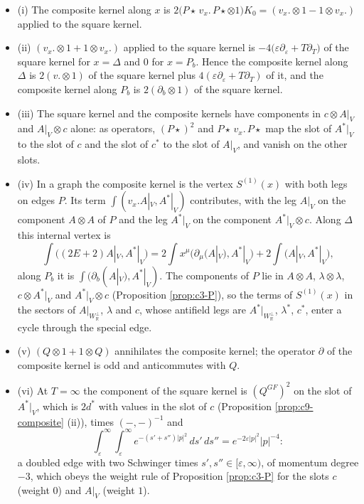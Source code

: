 \begin{lemma}
\label{lem:c11-kernels}
\begin{itemize}
\item (i) The composite kernel along $x$ is $2\big(P\star\,v_x.\,P\star\otimes1\big)K_0=(v_x.\otimes1-1\otimes v_x.)$ applied to the square kernel.
\item (ii) $(v_x.\otimes1+1\otimes v_x.)$ applied to the square kernel is $-4\big(\varepsilon\partial_\varepsilon+T\partial_T\big)$ of the square kernel for $x=\Delta$ and $0$ for $x=P_b$. Hence the composite kernel along $\Delta$ is $2(v.\otimes1)$ of the square kernel plus $4(\varepsilon\partial_\varepsilon+T\partial_T)$ of it, and the composite kernel along $P_b$ is $2(\partial_b\otimes1)$ of the square kernel.
\item (iii) The square kernel and the composite kernels have components in $c\otimes A|_V$ and $A|_V\otimes c$ alone: as operators, $(P\star)^2$ and $P\star\,v_x.\,P\star$ map the slot of $A^*|_V$ to the slot of $c$ and the slot of $c^*$ to the slot of $A|_V$, and vanish on the other slots.
\item (iv) In a graph the composite kernel is the vertex $S^{(1)}(x)$ with both legs on edges $P$. Its term $\int(v_x.A|_V,A^*|_V)$ contributes, with the leg $A|_V$ on the component $A\otimes A$ of $P$ and the leg $A^*|_V$ on the component $A^*|_V\otimes c$. Along $\Delta$ this internal vertex is
\[
\int\big((2E+2)A|_V,A^*|_V\big)=2\int x^\mu\big(\partial_\mu(A|_V),A^*|_V\big)+2\int\big(A|_V,A^*|_V\big),
\]
along $P_b$ it is $\int(\partial_b(A|_V),A^*|_V)$. The components of $P$ lie in $A\otimes A$, $\lambda\otimes\lambda$, $c\otimes A^*|_V$ and $A^*|_V\otimes c$ (Proposition \ref{prop:c3-P}), so the terms of $S^{(1)}(x)$ in the sectors of $A|_{W_{\mathbb R}^\perp}$, $\lambda$ and $c$, whose antifield legs are $A^*|_{W_{\mathbb R}^\perp}$, $\lambda^*$, $c^*$, enter a cycle through the special edge.
\item (v) $(Q\otimes1+1\otimes Q)$ annihilates the composite kernel; the operator $\partial$ of the composite kernel is odd and anticommutes with $Q$.
\item (vi) At $T=\infty$ the component of the square kernel is $(Q^{GF})^2$ on the slot of $A^*|_V$, which is $2d^*$ with values in the slot of $c$ (Proposition \ref{prop:c9-composite} (ii)), times $(-,-)^{-1}$ and
\[
\int_\varepsilon^\infty\!\!\int_\varepsilon^\infty e^{-(s'+s'')|p|^2}\,ds'\,ds''=e^{-2\varepsilon|p|^2}|p|^{-4}:
\]
a doubled edge with two Schwinger times $s',s''\in[\varepsilon,\infty)$, of momentum degree $-3$, which obeys the weight rule of Proposition \ref{prop:c3-P} for the slots $c$ (weight $0$) and $A|_V$ (weight $1$).
\end{itemize}
\end{lemma}

